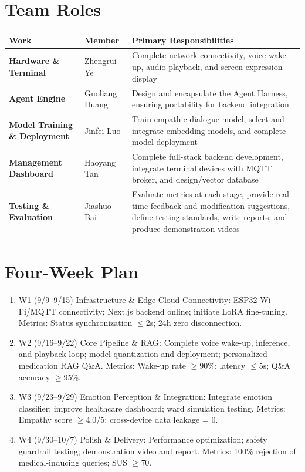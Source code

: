 \documentclass[11pt,a4paper]{article}
\begin{document}
\section{Team Roles}
\begin{table}[h]
\centering
\renewcommand{\arraystretch}{1.6}
\begin{tabularx}{\textwidth}{|>{\bfseries}p{5cm}|p{2.2cm}|X|}
\hline
\rowcolor{midgray}
Work & Member & Primary Responsibilities \\
\hline
Hardware \& Terminal & Zhengrui Ye & Complete network connectivity, voice wake-up, audio playback, and screen expression display \\
\hline
Agent Engine & Guoliang Huang & Design and encapsulate the Agent Harness, ensuring portability for backend integration \\
\hline
Model Training \& Deployment & Jinfei Luo & Train empathic dialogue model, select and integrate embedding models, and complete model deployment \\
\hline
Management Dashboard & Haoyang Tan & Complete full-stack backend development, integrate terminal devices with MQTT broker, and design/vector database \\
\hline
Testing \& Evaluation & Jiashuo Bai& Evaluate metrics at each stage, provide real-time feedback and modification suggestions, define testing standards, write reports, and produce demonstration videos \\
\hline
\end{tabularx}
\end{table}
\vspace{-6pt}
{\footnotesize\textit{}}



\section{Four-Week Plan}
\begin{enumerate}[leftmargin=*,itemsep=1pt,topsep=2pt]
    \item W1 (9/9--9/15) Infrastructure \& Edge-Cloud Connectivity: ESP32 Wi-Fi/MQTT connectivity; Next.js backend online; initiate LoRA fine-tuning. Metrics: Status synchronization $\leq$2s; 24h zero disconnection.
    \item W2 (9/16--9/22) Core Pipeline \& RAG: Complete voice wake-up, inference, and playback loop; model quantization and deployment; personalized medication RAG Q\&A. Metrics: Wake-up rate $\geq$90\%; latency $\leq$5s; Q\&A accuracy $\geq$95\%.
    \item W3 (9/23--9/29) Emotion Perception \& Integration: Integrate emotion classifier; improve healthcare dashboard; ward simulation testing. Metrics: Empathy score $\geq$4.0/5; cross-device data leakage = 0.
    \item W4 (9/30--10/7) Polish \& Delivery: Performance optimization; safety guardrail testing; demonstration video and report. Metrics: 100\% rejection of medical-inducing queries; SUS $\geq$70.
\end{enumerate}
\end{document}
